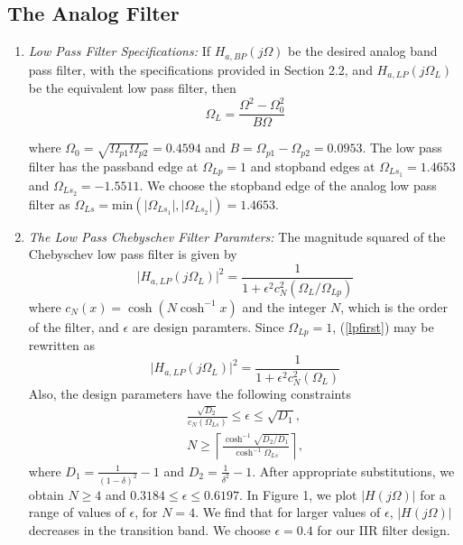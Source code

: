 \documentclass[journal,12pt,twocolumn]{IEEEtran}
\begin{document}
\subsection{The Analog Filter}
\begin{enumerate}

\item {\em Low Pass Filter Specifications:}  If $H_{a, BP}(j\Omega)$ be the desired analog band
pass filter,  with the specifications provided in Section 2.2, and $H_{a,LP}(j\Omega_L)$ 
be the equivalent low pass filter, then
\begin{equation}
\label{transition}
\Omega_L = \frac{\Omega^2 - \Omega_0^2}{B\Omega}
\end{equation}

where $\Omega_0 = \sqrt{\Omega_{p1}\Omega_{p2}} = 0.4594$ and $B = \Omega_{p1} - \Omega_{p2} = 0.0953$.  The low pass filter has
the passband edge at $\Omega_{Lp} = 1$ and stopband edges at $\Omega_{Ls_1} = 1.4653$ and $\Omega_{Ls_2} = -1.5511$.  We choose the stopband edge of the analog low pass filter as $\Omega_{Ls} = \mbox{min}(\vert \Omega_{Ls_1}\vert,\vert \Omega_{Ls_2}\vert) = 1.4653$.

\item {\em The Low Pass Chebyschev Filter Paramters:}  The magnitude squared of the Chebyschev low pass filter is given by 
\begin{equation}
\label{lpfirst}
\vert H_{a,LP}(j\Omega_L)\vert^2 = \frac{1}{1 + \epsilon^2c_N^2(\Omega_L/\Omega_{Lp})}
\end{equation}
where $c_N(x) = \cosh(N \cosh^{-1}x)$ and the integer $N$, which is the order of the filter, and $\epsilon$ are design paramters.  Since $\Omega_{Lp} = 1$, (\ref{lpfirst}) may be rewritten as
\begin{equation}
\label{lpsecond}
\vert H_{a,LP}(j\Omega_L)\vert^2 = \frac{1}{1 + \epsilon^2c_N^2(\Omega_L)}
\end{equation}
Also, the design parameters have the following constraints
\begin{eqnarray}
\label{lpdesign}
\frac{\sqrt{D_2}}{c_N(\Omega_{Ls})} \leq \epsilon \leq \sqrt{D_1}, \nonumber \\
N \geq \left\lceil \frac{\cosh^{-1}\sqrt{D_2/D_1}}{\cosh^{-1}\Omega_{Ls}} \right\rceil,
\end{eqnarray}
where $D_1 = \frac{1}{(1 - \delta)^2}-1$ and $D_2 = \frac{1}{\delta^2} - 1$.  After appropriate substitutions,
we obtain $N \geq 4$ and $0.3184 \leq \epsilon \leq 0.6197$.  In Figure 1, we plot $\vert H(j\Omega)\vert$ for a range of values of $\epsilon$, for $N = 4$.  We find that for larger values of $\epsilon$, $|H(j\Omega)|$ decreases in the transition band.  We choose $\epsilon = 0.4$  for our IIR filter design.  


\end{enumerate}
\end{document}
